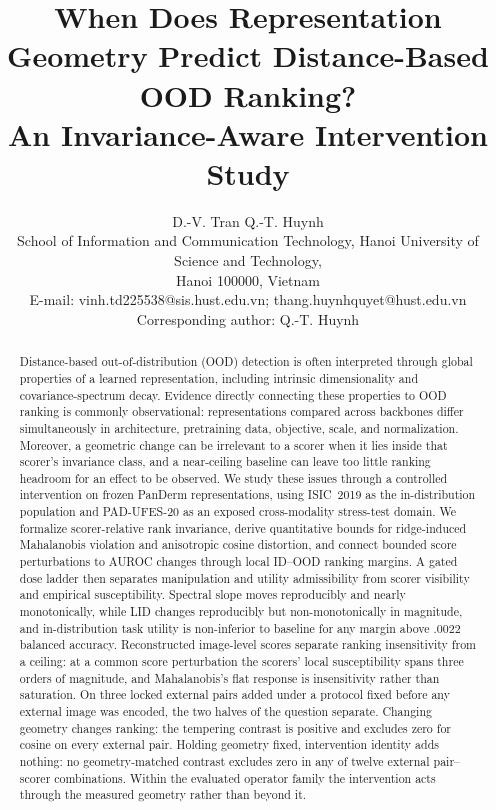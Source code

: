 \documentclass[11pt,a4paper]{article}
\begin{document}
\title{When Does Representation Geometry Predict Distance-Based OOD Ranking?\\
An Invariance-Aware Intervention Study}

\author{D.-V. Tran \quad Q.-T. Huynh\\[0.5em]
\small School of Information and Communication Technology, Hanoi University of Science and Technology,\\
\small Hanoi 100000, Vietnam\\
\small E-mail: vinh.td225538@sis.hust.edu.vn; thang.huynhquyet@hust.edu.vn\\
\small Corresponding author: Q.-T. Huynh}
\date{}

\maketitle

\begin{abstract}
Distance-based out-of-distribution (OOD) detection is often interpreted through global properties of a learned representation, including intrinsic dimensionality and covariance-spectrum decay. Evidence directly connecting these properties to OOD ranking is commonly observational: representations compared across backbones differ simultaneously in architecture, pretraining data, objective, scale, and normalization. Moreover, a geometric change can be irrelevant to a scorer when it lies inside that scorer's invariance class, and a near-ceiling baseline can leave too little ranking headroom for an effect to be observed. We study these issues through a controlled intervention on frozen PanDerm representations, using ISIC~2019 as the in-distribution population and PAD-UFES-20 as an exposed cross-modality stress-test domain. We formalize scorer-relative rank invariance, derive quantitative bounds for ridge-induced Mahalanobis violation and anisotropic cosine distortion, and connect bounded score perturbations to AUROC changes through local ID--OOD ranking margins. A gated dose ladder then separates manipulation and utility admissibility from scorer visibility and empirical susceptibility. Spectral slope moves reproducibly and nearly monotonically, while LID changes reproducibly but non-monotonically in magnitude, and in-distribution task utility is non-inferior to baseline for any margin above .0022 balanced accuracy. Reconstructed image-level scores separate ranking insensitivity from a ceiling: at a common score perturbation the scorers' local susceptibility spans three orders of magnitude, and Mahalanobis's flat response is insensitivity rather than saturation. On three locked external pairs added under a protocol fixed before any external image was encoded, the two halves of the question separate. Changing geometry changes ranking: the tempering contrast is positive and excludes zero for cosine on every external pair. Holding geometry fixed, intervention identity adds nothing: no geometry-matched contrast excludes zero in any of twelve external pair--scorer combinations. Within the evaluated operator family the intervention acts through the measured geometry rather than beyond it.
\end{abstract}
\end{document}

